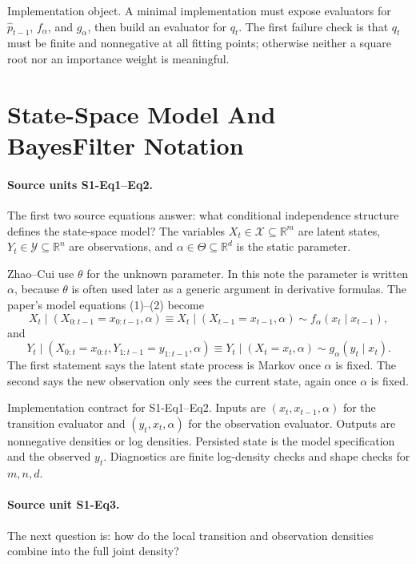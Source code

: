 \documentclass[11pt]{article}
\newcommand{\R}{\mathbb R}
\begin{document}
Implementation object.  A minimal implementation must expose evaluators for
\(\widehat p_{t-1}\), \(f_\alpha\), and \(g_\alpha\), then build an evaluator
for \(q_t\).  The first failure check is that \(q_t\) must be finite and
nonnegative at all fitting points; otherwise neither a square root nor an
importance weight is meaningful.

\section{State-Space Model And BayesFilter Notation}

\paragraph{Source units S1-Eq1--Eq2.}
The first two source equations answer: what conditional independence structure
defines the state-space model?  The variables \(X_t\in\mathcal X\subseteq\R^m\)
are latent states, \(Y_t\in\mathcal Y\subseteq\R^n\) are observations, and
\(\alpha\in\Theta\subseteq\R^d\) is the static parameter.

Zhao--Cui use \(\theta\) for the unknown parameter.  In this note the parameter
is written \(\alpha\), because \(\theta\) is often used later as a generic
argument in derivative formulas.  The paper's model equations (1)--(2) become
\[
    X_t\mid (X_{0:t-1}=x_{0:t-1},\alpha)
    \equiv
    X_t\mid (X_{t-1}=x_{t-1},\alpha)
    \sim f_\alpha(x_t\mid x_{t-1}),
    \tag{BF-1}
\]
and
\[
    Y_t\mid (X_{0:t}=x_{0:t},Y_{1:t-1}=y_{1:t-1},\alpha)
    \equiv
    Y_t\mid (X_t=x_t,\alpha)
    \sim g_\alpha(y_t\mid x_t).
    \tag{BF-2}
\]
The first statement says the latent state process is Markov once \(\alpha\) is
fixed.  The second says the new observation only sees the current state, again
once \(\alpha\) is fixed.

Implementation contract for S1-Eq1--Eq2.  Inputs are \((x_t,x_{t-1},\alpha)\)
for the transition evaluator and \((y_t,x_t,\alpha)\) for the observation
evaluator.  Outputs are nonnegative densities or log densities.  Persisted
state is the model specification and the observed \(y_t\).  Diagnostics are
finite log-density checks and shape checks for \(m,n,d\).

\paragraph{Source unit S1-Eq3.}
The next question is: how do the local transition and observation densities
combine into the full joint density?
\end{document}
